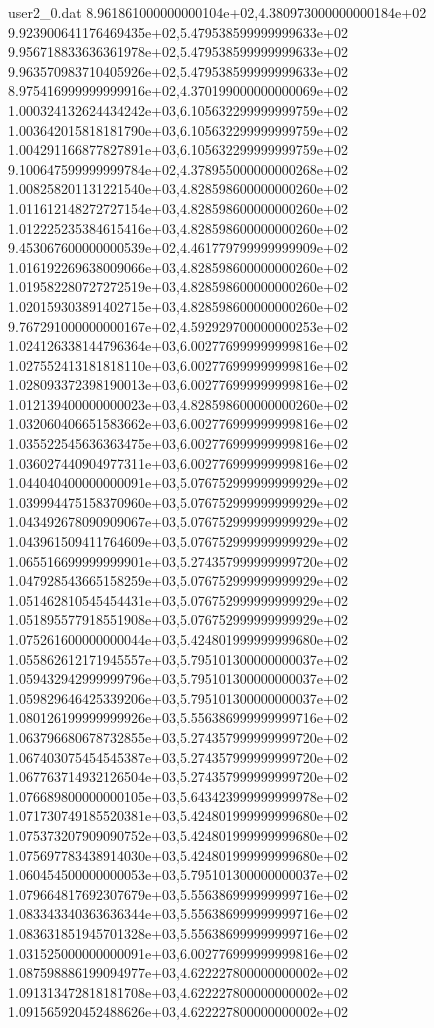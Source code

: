 \begin{filecontents}{user2_0.dat}
8.961861000000000104e+02,4.380973000000000184e+02
9.923900641176469435e+02,5.479538599999999633e+02
9.956718833636361978e+02,5.479538599999999633e+02
9.963570983710405926e+02,5.479538599999999633e+02
8.975416999999999916e+02,4.370199000000000069e+02
1.000324132624434242e+03,6.105632299999999759e+02
1.003642015818181790e+03,6.105632299999999759e+02
1.004291166877827891e+03,6.105632299999999759e+02
9.100647599999999784e+02,4.378955000000000268e+02
1.008258201131221540e+03,4.828598600000000260e+02
1.011612148272727154e+03,4.828598600000000260e+02
1.012225235384615416e+03,4.828598600000000260e+02
9.453067600000000539e+02,4.461779799999999909e+02
1.016192269638009066e+03,4.828598600000000260e+02
1.019582280727272519e+03,4.828598600000000260e+02
1.020159303891402715e+03,4.828598600000000260e+02
9.767291000000000167e+02,4.592929700000000253e+02
1.024126338144796364e+03,6.002776999999999816e+02
1.027552413181818110e+03,6.002776999999999816e+02
1.028093372398190013e+03,6.002776999999999816e+02
1.012139400000000023e+03,4.828598600000000260e+02
1.032060406651583662e+03,6.002776999999999816e+02
1.035522545636363475e+03,6.002776999999999816e+02
1.036027440904977311e+03,6.002776999999999816e+02
1.044040400000000091e+03,5.076752999999999929e+02
1.039994475158370960e+03,5.076752999999999929e+02
1.043492678090909067e+03,5.076752999999999929e+02
1.043961509411764609e+03,5.076752999999999929e+02
1.065516699999999901e+03,5.274357999999999720e+02
1.047928543665158259e+03,5.076752999999999929e+02
1.051462810545454431e+03,5.076752999999999929e+02
1.051895577918551908e+03,5.076752999999999929e+02
1.075261600000000044e+03,5.424801999999999680e+02
1.055862612171945557e+03,5.795101300000000037e+02
1.059432942999999796e+03,5.795101300000000037e+02
1.059829646425339206e+03,5.795101300000000037e+02
1.080126199999999926e+03,5.556386999999999716e+02
1.063796680678732855e+03,5.274357999999999720e+02
1.067403075454545387e+03,5.274357999999999720e+02
1.067763714932126504e+03,5.274357999999999720e+02
1.076689800000000105e+03,5.643423999999999978e+02
1.071730749185520381e+03,5.424801999999999680e+02
1.075373207909090752e+03,5.424801999999999680e+02
1.075697783438914030e+03,5.424801999999999680e+02
1.060454500000000053e+03,5.795101300000000037e+02
1.079664817692307679e+03,5.556386999999999716e+02
1.083343340363636344e+03,5.556386999999999716e+02
1.083631851945701328e+03,5.556386999999999716e+02
1.031525000000000091e+03,6.002776999999999816e+02
1.087598886199094977e+03,4.622227800000000002e+02
1.091313472818181708e+03,4.622227800000000002e+02
1.091565920452488626e+03,4.622227800000000002e+02

\end{filecontents}
